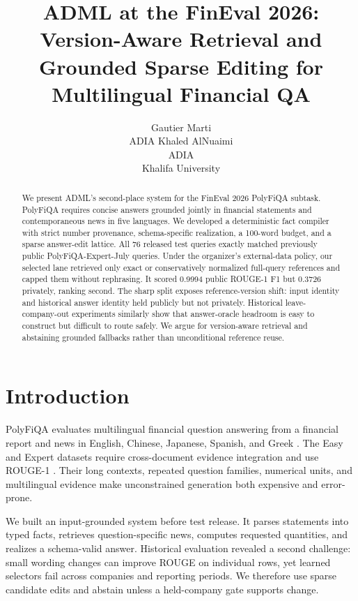 \documentclass[11pt]{article}
\title{ADML at the FinEval 2026: Version-Aware Retrieval and Grounded Sparse Editing for Multilingual Financial QA}
\author{Gautier Marti \\
  ADIA
  \And
  Khaled AlNuaimi \\
  ADIA \\
  Khalifa University}
\begin{document}
\maketitle

\begin{abstract}
We present ADML's second-place system for the FinEval 2026 PolyFiQA subtask. PolyFiQA requires concise answers grounded jointly in financial statements and contemporaneous news in five languages. We developed a deterministic fact compiler with strict number provenance, schema-specific realization, a 100-word budget, and a sparse answer-edit lattice. All 76 released test queries exactly matched previously public PolyFiQA-Expert-July queries. Under the organizer's external-data policy, our selected lane retrieved only exact or conservatively normalized full-query references and capped them without rephrasing. It scored 0.9994 public ROUGE-1 F1 but 0.3726 privately, ranking second. The sharp split exposes reference-version shift: input identity and historical answer identity held publicly but not privately. Historical leave-company-out experiments similarly show that answer-oracle headroom is easy to construct but difficult to route safely. We argue for version-aware retrieval and abstaining grounded fallbacks rather than unconditional reference reuse.
\end{abstract}

\section{Introduction}
PolyFiQA evaluates multilingual financial question answering from a financial report and news in English, Chinese, Japanese, Spanish, and Greek \citep{peng-etal-2026-multifinben}. The Easy and Expert datasets require cross-document evidence integration and use ROUGE-1 \citep{lin-2004-rouge}. Their long contexts, repeated question families, numerical units, and multilingual evidence make unconstrained generation both expensive and error-prone.

We built an input-grounded system before test release. It parses statements into typed facts, retrieves question-specific news, computes requested quantities, and realizes a schema-valid answer. Historical evaluation revealed a second challenge: small wording changes can improve ROUGE on individual rows, yet learned selectors fail across companies and reporting periods. We therefore use sparse candidate edits and abstain unless a held-company gate supports change.
\end{document}
